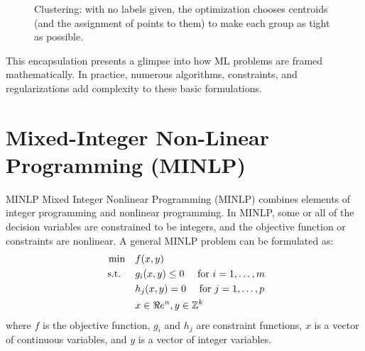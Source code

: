 \begin{figure}[h]
\centering
{}
\caption{Clustering: with no labels given, the optimization chooses centroids (and the assignment of points to them) to make each group as tight as possible.}
\label{fig:ml-clustering}
\end{figure}

This encapsulation presents a glimpse into how ML problems are framed mathematically. In practice, numerous algorithms, constraints, and regularizations add complexity to these basic formulations.

\section{Mixed-Integer Non-Linear Programming (MINLP)}
\label{sec:intro-MINLP}

\begin{general}{MINLP}{\nphard}
Mixed Integer Nonlinear Programming (MINLP) combines elements of integer programming and nonlinear programming. In MINLP, some or all of the decision variables are constrained to be integers, and the objective function or constraints are nonlinear. A general MINLP problem can be formulated as:
\begin{equation}
\label{eq:minlp}
\begin{split}
\min \quad & f(x, y)\\
\mbox{ s.t. }  \quad & g_i(x, y) \leq 0  \quad  \mbox{ for } i=1, \dots, m\\
           & h_j(x, y) = 0    \quad  \mbox{ for } j=1, \dots, p\\
           & x \in \Re e^n, y \in \mathbb{Z}^k
\end{split}
\end{equation}
where $f$ is the objective function, $g_i$ and $h_j$ are constraint functions, $x$ is a vector of continuous variables, and $y$ is a vector of integer variables.
\end{general}

